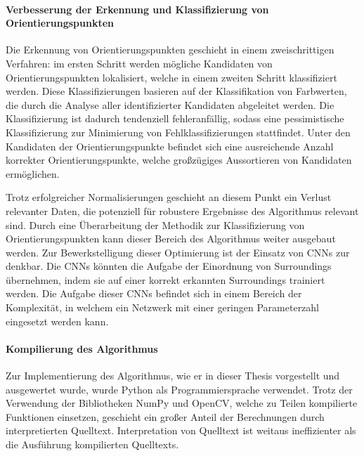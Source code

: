 \paragraph{Verbesserung der Erkennung und Klassifizierung von Orientierungspunkten}

Die Erkennung von Orientierungspunkten geschieht in einem zweischrittigen Verfahren: im ersten Schritt werden mögliche Kandidaten von Orientierungspunkten lokalisiert, welche in einem zweiten Schritt klassifiziert werden. Diese Klassifizierungen basieren auf der Klassifikation von Farbwerten, die durch die Analyse aller identifizierter Kandidaten abgeleitet werden. Die Klassifizierung ist dadurch tendenziell fehleranfällig, sodass eine pessimistische Klassifizierung zur Minimierung von Fehlklassifizierungen stattfindet. Unter den Kandidaten der Orientierungspunkte befindet sich eine ausreichende Anzahl korrekter Orientierungspunkte, welche großzügiges Aussortieren von Kandidaten ermöglichen.

Trotz erfolgreicher Normalisierungen geschieht an diesem Punkt ein Verlust relevanter Daten, die potenziell für robustere Ergebnisse des Algorithmus relevant sind. Durch eine Überarbeitung der Methodik zur Klassifizierung von Orientierungspunkten kann dieser Bereich des Algorithmus weiter ausgebaut werden. Zur Bewerkstelligung dieser Optimierung ist der Einsatz von CNNs zur denkbar. Die CNNs könnten die Aufgabe der Einordnung von Surroundings übernehmen, indem sie auf einer korrekt erkannten Surroundings trainiert werden. Die Aufgabe dieser CNNs befindet sich in einem Bereich der Komplexität, in welchem ein Netzwerk mit einer geringen Parameterzahl eingesetzt werden kann.


\paragraph{Kompilierung des Algorithmus}

Zur Implementierung des Algorithmus, wie er in dieser Thesis vorgestellt und ausgewertet wurde, wurde Python als Programmiersprache verwendet. Trotz der Verwendung der Bibliotheken NumPy und OpenCV, welche zu Teilen kompilierte Funktionen einsetzen, geschieht ein großer Anteil der Berechnungen durch interpretierten Quelltext. Interpretation von Quelltext ist weitaus ineffizienter als die Ausführung kompilierten Quelltexts.

